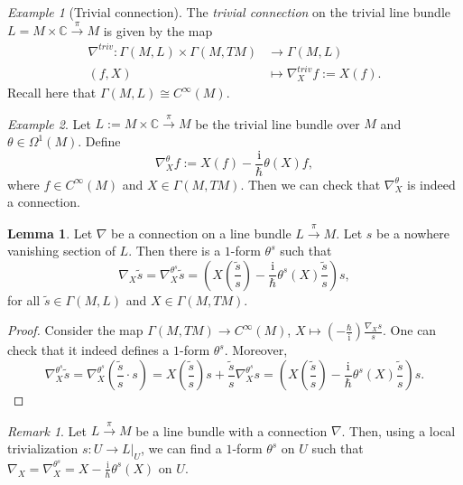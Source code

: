 \documentclass[12pt]{amsart}
\numberwithin{equation}{section}
\theoremstyle{plain}
\theoremstyle{definition}
\newtheorem{lem}{Lemma}[subsection]
\theoremstyle{remark}
\newtheorem{rem}{Remark}[subsection]
\newtheorem{ex}{Example}[subsection]
\newcommand{\I}{\mathrm{i}}
\begin{document}
\begin{ex}[Trivial connection]
The \emph{trivial connection} on the trivial line bundle $L=M\times\mathbb{C}\xrightarrow{\pi}M$ is given by the map 
\begin{align*}
\nabla^{triv}\colon \Gamma(M,L)\times \Gamma(M,TM)&\to \Gamma(M,L)\\
(f,X)&\mapsto \nabla^{triv}_Xf:=X(f).
\end{align*}
Recall here that $\Gamma(M,L)\cong C^\infty(M)$.
\end{ex}

\begin{ex}
Let $L:=M\times \mathbb{C}\xrightarrow{\pi}M$ be the trivial line bundle over $M$ and $\theta\in\Omega^1(M)$. Define 
$$\nabla_X^\theta f:=X(f)-\frac{\I}{\hbar}\theta(X)f,$$
where $f\in C^\infty(M)$ and $X\in\Gamma(M,TM)$. Then we can check that $\nabla^\theta_X$ is indeed a connection.
\end{ex}


\begin{lem}
Let $\nabla$ be a connection on a line bundle $L\xrightarrow{\pi}M$. Let $s$ be a nowhere vanishing section of $L$. Then there is a $1$-form $\theta^s$ such that 
$$\nabla_X\tilde s=\nabla_X^{\theta^s}\tilde{s}=\left( X\left(\frac{\tilde{s}}{s}\right)-\frac{\I}{\hbar}\theta^s(X)\frac{\tilde{s}}{s}\right)s,$$
for all $\tilde{s}\in\Gamma(M,L)$ and $X\in \Gamma(M,TM)$.
\end{lem}

\begin{proof}
Consider the map $\Gamma(M,TM)\to C^\infty(M)$, $X\mapsto\left(-\frac{\hbar}{\I}\right) \frac{\nabla_Xs}{s}$. One can check that it indeed defines a $1$-form $\theta^s$. Moreover, 
\[
\nabla^{\theta^s}_X\tilde{s}=\nabla^{\theta^s}_X\left(\frac{\tilde{s}}{s}\cdot s\right)=X\left(\frac{\tilde{s}}{s}\right)s+\frac{\tilde{s}}{s}\nabla^{\theta^s}_Xs=\left( X\left(\frac{\tilde{s}}{s}\right)-\frac{\I}{\hbar}\theta^s(X)\frac{\tilde{s}}{s}\right)s.
\]
\end{proof}

\begin{rem}
Let $L\xrightarrow{\pi}M$ be a line bundle with a connection $\nabla$. Then, using a local trivialization $s\colon U\to L\big|_U$, we can find a $1$-form $\theta^s$ on $U$ such that $\nabla_X=\nabla^{\theta^s}_X=X-\frac{\I}{\hbar}\theta^s(X)$ on $U$.
\end{rem}
\end{document}
